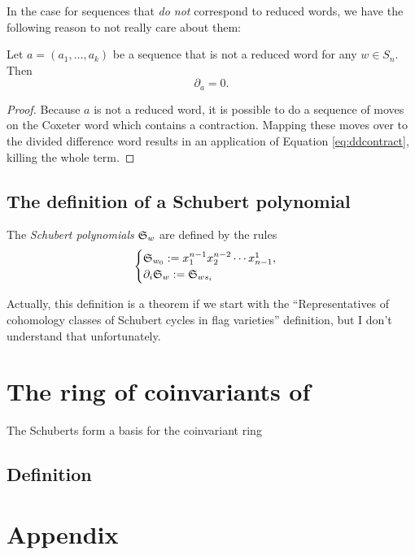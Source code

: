 \documentclass{article}
\newcommand{\frkS}{\ensuremath\mathfrak{S}}
\begin{document}
In the case for sequences that \textit{do not} correspond to reduced words, we have the following reason to not really care about them:
\begin{theorem}\label{thm:ddnonreducedzero}
    Let $a=(a_1,\ldots,a_k)$ be a sequence that is not a reduced word for any $w \in S_n$. Then
    \[
        \partial_a = 0.
    \]
\end{theorem}

\begin{proof}
    Because $a$ is not a reduced word, it is possible to do a sequence of moves on the Coxeter word which contains a contraction.
    Mapping these moves over to the divided difference word results in an application of Equation \ref{eq:ddcontract}, killing the whole term.
\end{proof}

\subsection{The definition of a Schubert polynomial}

\begin{definition}
    The \textit{Schubert polynomials} $\frkS_w$ are defined by the rules
    \[
        \begin{cases}
        \frkS_{w_0} := x_1^{n-1}x_2^{n-2}\cdots x_{n-1}^1, \\
        \partial_i\frkS_w := \frkS_{ws_i}
        \end{cases}
    \]
\end{definition}

Actually, this definition is a theorem if we start with the ``Representatives of cohomology classes of Schubert cycles in flag varieties'' definition, but I don't understand that unfortunately.

\section{The ring of coinvariants of}

\begin{theorem}
    The Schuberts form a basis for the coinvariant ring 
\end{theorem}
\subsection{Definition}


\section{Appendix}
\end{document}
